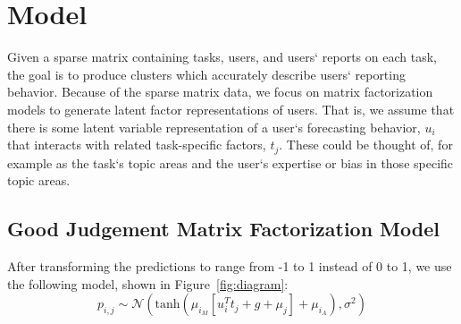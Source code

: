 \documentclass{article}
\begin{document}
%


\section{Model}





Given a sparse matrix containing tasks, users, and users` reports on each task, the goal is to produce clusters which accurately describe users` reporting behavior. Because of the sparse matrix data, we focus on matrix factorization models to generate latent factor representations of users. That is, we assume that there is some latent variable representation of a user`s forecasting behavior, $u_i$ that interacts with related task-specific factors, $t_j$. These could be thought of, for example as the task`s topic areas and the user`s expertise or bias in those specific topic areas. 

\subsection{Good Judgement Matrix Factorization Model} After transforming the predictions to range from -1 to 1 instead of 0 to 1, we use the following model, shown in Figure~\ref{fig:diagram}:  
  $$
  p_{i,j} \sim \mathcal{N}(\textrm{tanh}\left( \mu_{i_M}\left[u_i^{T}t_j + g + \mu_j\right] + \mu_{i_A}\right), \sigma^2)
 $$
 
\end{document}
